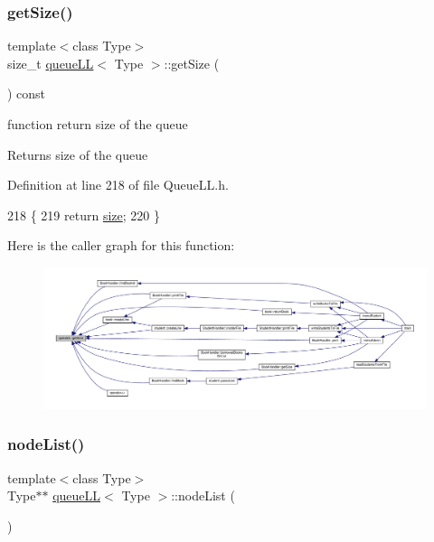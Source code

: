 \subsubsection{\texorpdfstring{get\+Size()}{getSize()}}
{\footnotesize\ttfamily template$<$class Type$>$ \\
size\+\_\+t \hyperlink{classqueue_l_l}{queue\+LL}$<$ Type $>$\+::get\+Size (\begin{DoxyParamCaption}{ }\end{DoxyParamCaption}) const\hspace{0.3cm}{\ttfamily [inline]}}

function return size of the queue \begin{DoxyReturn}{Returns}
size of the queue 
\end{DoxyReturn}


Definition at line 218 of file Queue\+L\+L.\+h.


\begin{DoxyCode}
218                            \{
219         \textcolor{keywordflow}{return} \hyperlink{classqueue_l_l_af2ae538d6971624f1c8404d3a8502aa0}{size};
220     \}
\end{DoxyCode}
Here is the caller graph for this function\+:
\nopagebreak
\begin{figure}[H]
\begin{center}
\leavevmode
\includegraphics[width=350pt]{classqueue_l_l_a8969feebcb563f0b489bc112422b9563_icgraph}
\end{center}
\end{figure}
\mbox{\label{classqueue_l_l_ae9a479b9463f51c5148dd80b68335d32}} 
\subsubsection{\texorpdfstring{node\+List()}{nodeList()}}
{\footnotesize\ttfamily template$<$class Type$>$ \\
Type$\ast$$\ast$ \hyperlink{classqueue_l_l}{queue\+LL}$<$ Type $>$\+::node\+List (\begin{DoxyParamCaption}{ }\end{DoxyParamCaption})\hspace{0.3cm}{\ttfamily [inline]}}

